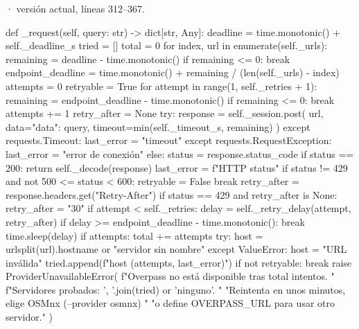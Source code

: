 \documentclass[11pt,a4paper]{article}
\begin{document}
\smallskip
{\footnotesize\texttt{} · versión actual, líneas 312--367.}\par
\begin{Codigo}[firstnumber=312]
    def _request(self, query: str) -> dict[str, Any]:
        deadline = time.monotonic() + self._deadline_s
        tried = []
        total = 0
        for index, url in enumerate(self._urls):
            remaining = deadline - time.monotonic()
            if remaining <= 0:
                break
            endpoint_deadline = time.monotonic() + remaining / (len(self._urls) - index)
            attempts = 0
            retryable = True
            for attempt in range(1, self._retries + 1):
                remaining = endpoint_deadline - time.monotonic()
                if remaining <= 0:
                    break
                attempts += 1
                retry_after = None
                try:
                    response = self._session.post(
                        url, data={"data": query}, timeout=min(self._timeout_s, remaining)
                    )
                except requests.Timeout:
                    last_error = "timeout"
                except requests.RequestException:
                    last_error = "error de conexión"
                else:
                    status = response.status_code
                    if status == 200:
                        return self._decode(response)
                    last_error = f"HTTP {status}"
                    if status != 429 and not 500 <= status < 600:
                        retryable = False
                        break
                    retry_after = response.headers.get("Retry-After")
                    if status == 429 and retry_after is None:
                        retry_after = "30"
                if attempt < self._retries:
                    delay = self._retry_delay(attempt, retry_after)
                    if delay >= endpoint_deadline - time.monotonic():
                        break
                    time.sleep(delay)
            if attempts:
                total += attempts
                try:
                    host = urlsplit(url).hostname or "servidor sin nombre"
                except ValueError:
                    host = "URL inválida"
                tried.append(f"{host} ({attempts}, {last_error})")
            if not retryable:
                break
        raise ProviderUnavailableError(
            f"Overpass no está disponible tras {total} intentos. "
            f"Servidores probados: {', '.join(tried) or 'ninguno'}. "
            "Reintenta en unos minutos, elige OSMnx (--provider osmnx) "
            "o define OVERPASS_URL para usar otro servidor."
        )
\end{Codigo}
\end{document}
